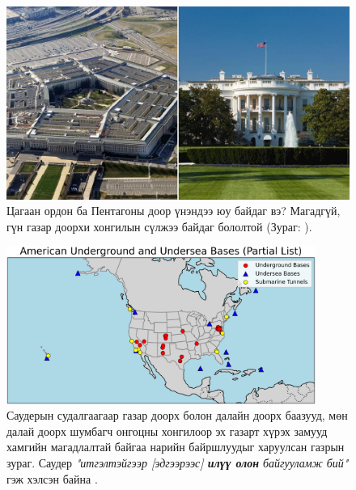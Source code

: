 \documentclass[10pt,twocolumn,letterpaper]{article}
\begin{document}
\begin{figure}[b]
\begin{center}
   \includegraphics[width=1\linewidth]{penta.jpg}
\end{center}
   \caption{Цагаан ордон ба Пентагоны доор үнэндээ юу байдаг вэ? Магадгүй, гүн газар доорхи хонгилын сүлжээ байдаг бололтой (Зураг: \cite{31}).}
\label{fig:3}
\label{fig:onecol}
\end{figure}
\begin{figure}[t]
\begin{center}
\includegraphics[width=0.9\textwidth]{basescrop.png}
\end{center}
   \caption{Саудерын судалгаагаар газар доорх болон далайн доорх баазууд, мөн далай доорх шумбагч онгоцны хонгилоор эх газарт хүрэх замууд хамгийн магадлалтай байгаа нарийн байршлуудыг харуулсан газрын зураг. Саудер \textit{"итгэлтэйгээр [эдгээрээс] \textbf{илүү олон} байгууламж бий"} гэж хэлсэн байна \cite{22}.}
   \label{fig:4}
\end{figure}
\end{document}
